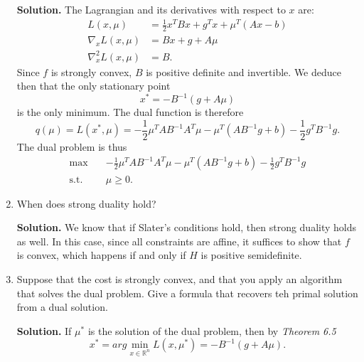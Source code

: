 \begin{enumerate}[label=(\alph*)]
      \medskip\textbf{Solution.} The Lagrangian and its derivatives with respect
      to $x$ are:
      \[
      \begin{aligned}
        L(x,\mu) & = \frac{1}{2}x^T B x + g^T x + \mu^T(Ax-b) \\
        \nabla_x L(x,\mu) & = Bx + g + A\mu \\
        \nabla_x^2 L(x,\mu) & = B.
      \end{aligned}
      \]
      Since $f$ is strongly convex, $B$ is positive definite and invertible. We
      deduce then that the only stationary point
      \[
      x^* = -B^{-1}(g+A\mu)
      \] 
      is the only minimum. The dual function is therefore
      \[
        q(\mu) = L(x^*,\mu) =
        -\frac{1}{2} \mu^TA B^{-1} A^T\mu - \mu^T(AB^{-1}g + b) -
        \frac{1}{2}g^TB^{-1}g
      .\] 
      The dual problem is thus
      \[
      \begin{aligned}
        \max \quad &  -\frac{1}{2} \mu^TA B^{-1} A^T\mu - \mu^T(AB^{-1}g + b) - \frac{1}{2}g^TB^{-1}g \\
        \textrm{s.t.} \quad & \mu\ge 0.
      \end{aligned}
      \] 

    \item When does strong duality hold?

      \medskip\textbf{Solution.} We know that if Slater's conditions hold, then
      strong duality holds as well. In this case, since all constraints are
      affine, it suffices to show that $f$ is convex, which happens if and only
      if $H$ is positive semidefinite.

    \item Suppose that the cost is strongly convex, and that you apply an
      algorithm that solves the dual problem. Give a formula that recovers teh
      primal solution from a dual solution.

      \medskip\textbf{Solution.} If $\mu^*$ is the solution of the dual problem,
      then by \textit{Theorem 6.5}
      \[
      x^* = arg\min_{x\in \mathbb{R}^n} L(x,\mu^*) = -B^{-1}(g+A\mu)
      .\] 

  \end{enumerate}
